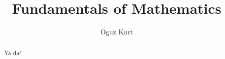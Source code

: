 \documentclass{xourse}
\title{Fundamentals of Mathematics}
\author{Oguz Kurt}
\begin{document}
\begin{abstract}
Ya da!
\end{abstract}

\maketitle
\end{document}
